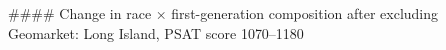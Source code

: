 #### Change in race × first-generation composition after excluding Geomarket: Long Island, PSAT score 1070–1180
